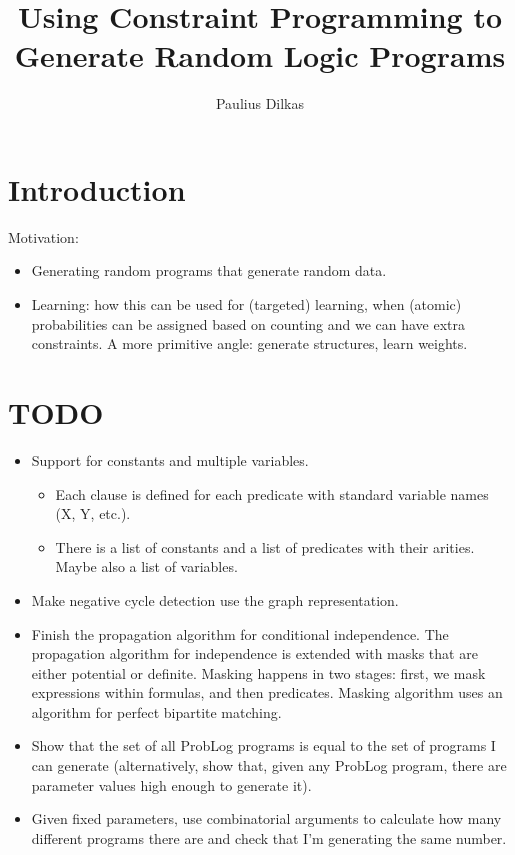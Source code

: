 \documentclass{article}
\author{Paulius Dilkas}
\title{Using Constraint Programming to Generate Random Logic Programs}
\begin{document}
\maketitle

\section{Introduction}

Motivation:
\begin{itemize}
\item Generating random programs that generate random data.
\item Learning: how this can be used for (targeted) learning, when (atomic)
  probabilities can be assigned based on counting and we can have extra
  constraints. A more primitive angle: generate structures, learn weights.
\end{itemize}

\section{TODO}

\begin{itemize}
\item Support for constants and multiple variables.
  \begin{itemize}
  \item Each clause is defined for each predicate with standard variable names
    (X, Y, etc.).
  \item There is a list of constants and a list of predicates with their
    arities. Maybe also a list of variables.
  \end{itemize}
\item Make negative cycle detection use the graph representation.
\item Finish the propagation algorithm for conditional independence. The
  propagation algorithm for independence is extended with masks that are either
  potential or definite. Masking happens in two stages: first, we mask
  expressions within formulas, and then predicates. Masking algorithm uses an
  algorithm for perfect bipartite matching.
\item Show that the set of all ProbLog programs is equal to the set of programs
  I can generate (alternatively, show that, given any ProbLog program, there are
  parameter values high enough to generate it).
\item Given fixed parameters, use combinatorial arguments to calculate how many
  different programs there are and check that I'm generating the same number.
\end{itemize}
\end{document}
